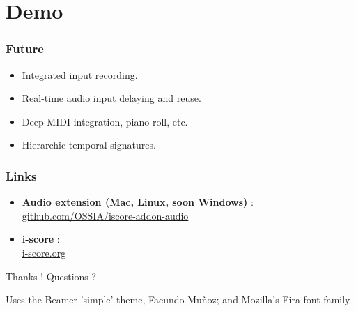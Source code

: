 \documentclass{beamer}
\begin{document}
\section{Demo}
\begin{frame}
    \Huge
\end{frame}

\begin{frame}
	\frametitle{Future} 
	\Large
	\begin{itemize}
		\item<1> Integrated input recording.
		\item<2> Real-time audio input delaying and reuse.
		\item<3> Deep MIDI integration, piano roll, etc.
		\item<4> Hierarchic temporal signatures.
		
	\end{itemize}
\end{frame}    

\begin{frame}
    \frametitle{Links} 
    \Large
    \begin{itemize}
        \setlength\itemsep{1em}
        \item \textbf{Audio extension ({\unicodefun Mac, Linux, soon Windows})} :~\\
        \url{github.com/OSSIA/iscore-addon-audio} 
        \item \textbf{i-score} :~\\
         \url{i-score.org}
    \end{itemize}
        
    \centering
    \vspace{2em}
    \Large{Thanks ! Questions ?}
    \vspace{2em}
    
    \tiny{Uses the Beamer 'simple' theme, Facundo Muñoz; and Mozilla's Fira font family}
\end{frame}
\end{document}
